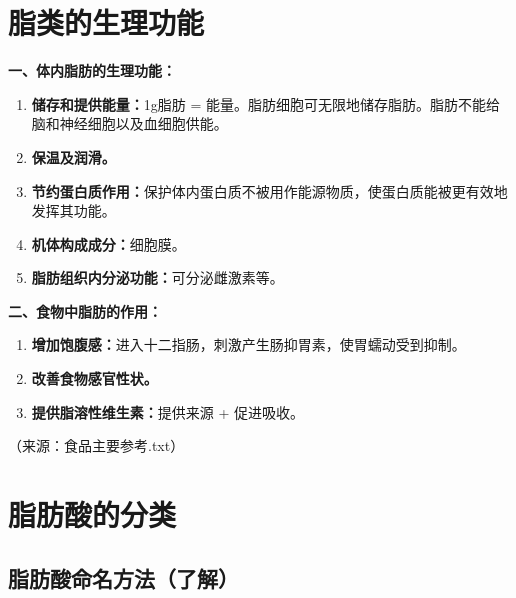 \section{脂类的生理功能}

\begin{tipbox}
\textbf{一、体内脂肪的生理功能：}
\begin{enumerate}[leftmargin=*]
    \item \textbf{储存和提供能量：}1g脂肪 = 能量。脂肪细胞可无限地储存脂肪。脂肪不能给脑和神经细胞以及血细胞供能。
    \item \textbf{保温及润滑。}
    \item \textbf{节约蛋白质作用：}保护体内蛋白质不被用作能源物质，使蛋白质能被更有效地发挥其功能。
    \item \textbf{机体构成成分：}细胞膜。
    \item \textbf{脂肪组织内分泌功能：}可分泌雌激素等。
\end{enumerate}

\textbf{二、食物中脂肪的作用：}
\begin{enumerate}[leftmargin=*]
    \item \textbf{增加饱腹感：}进入十二指肠，刺激产生肠抑胃素，使胃蠕动受到抑制。
    \item \textbf{改善食物感官性状。}
    \item \textbf{提供脂溶性维生素：}提供来源 + 促进吸收。
\end{enumerate}
（来源：食品主要参考.txt）
\end{tipbox}

\section{脂肪酸的分类}

\subsection{脂肪酸命名方法（了解）}

